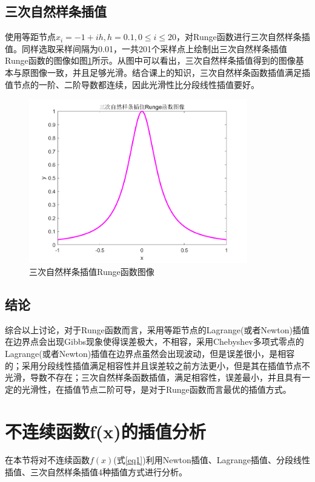 \documentclass[a4paper]{article}
\begin{document}
\subsection{三次自然样条插值}
使用等距节点$x_i=-1+ih,h=0.1,0\le i\le 20$，对Runge函数进行三次自然样条插值。同样选取采样间隔为0.01，一共201个采样点上绘制出三次自然样条插值Runge函数的图像如图\ref{fig:9}所示。从图中可以看出，三次自然样条插值得到的图像基本与原图像一致，并且足够光滑。结合课上的知识，三次自然样条函数插值满足插值节点的一阶、二阶导数都连续，因此光滑性比分段线性插值要好。

\begin{figure}[!h]
	\centering
	\includegraphics[width=0.85\textwidth]{../code/result/splinerunge}
	\caption{\label{fig:9}三次自然样条插值Runge函数图像}
\end{figure}

\subsection{结论}
综合以上讨论，对于Runge函数而言，采用等距节点的Lagrange(或者Newton)插值在边界点会出现Gibbs现象使得误差极大，不相容，采用Chebyshev多项式零点的Lagrange(或者Newton)插值在边界点虽然会出现波动，但是误差很小，是相容的；采用分段线性插值满足相容性并且误差较之前方法更小，但是其在插值节点不光滑，导数不存在；三次自然样条函数插值，满足相容性，误差最小，并且具有一定的光滑性，在插值节点二阶可导，是对于Runge函数而言最优的插值方式。

\section{不连续函数f(x)的插值分析}
在本节将对不连续函数$f(x)$(式\ref{eq1})利用Newton插值、Lagrange插值、分段线性插值、三次自然样条插值4种插值方式进行分析。
\end{document}
